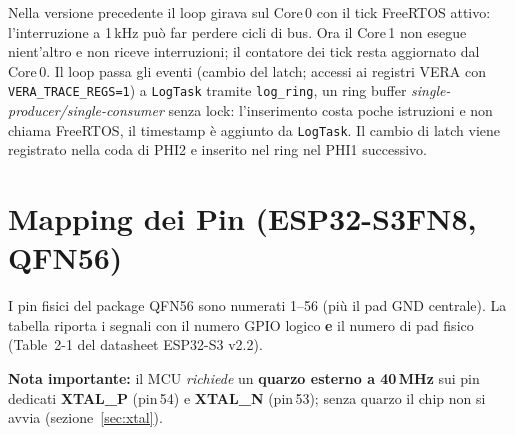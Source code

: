 \documentclass[12pt, a4paper]{article}
\begin{document}
Nella versione precedente il loop girava sul Core\,0 con il tick FreeRTOS attivo: l'interruzione a 1\,kHz può far perdere cicli di bus. Ora il Core\,1 non esegue nient'altro e non riceve interruzioni; il contatore dei tick resta aggiornato dal Core\,0. Il loop passa gli eventi (cambio del latch; accessi ai registri VERA con \texttt{VERA\_TRACE\_REGS=1}) a \texttt{LogTask} tramite \texttt{log\_ring}, un ring buffer \emph{single-producer/single-consumer} senza lock: l'inserimento costa poche istruzioni e non chiama FreeRTOS, il timestamp è aggiunto da \texttt{LogTask}. Il cambio di latch viene registrato nella coda di PHI2 e inserito nel ring nel PHI1 successivo.

\section{Mapping dei Pin (ESP32-S3FN8, QFN56)}

I pin fisici del package QFN56 sono numerati 1--56 (più il pad GND centrale). La tabella riporta i segnali con il numero GPIO logico \textbf{e} il numero di pad fisico (Table~2-1 del datasheet ESP32-S3 v2.2).

\textbf{Nota importante:} il MCU \emph{richiede} un \textbf{quarzo esterno a 40\,MHz} sui pin dedicati \textbf{XTAL\_P} (pin\,54) e \textbf{XTAL\_N} (pin\,53); senza quarzo il chip non si avvia (sezione~\ref{sec:xtal}).
\end{document}
